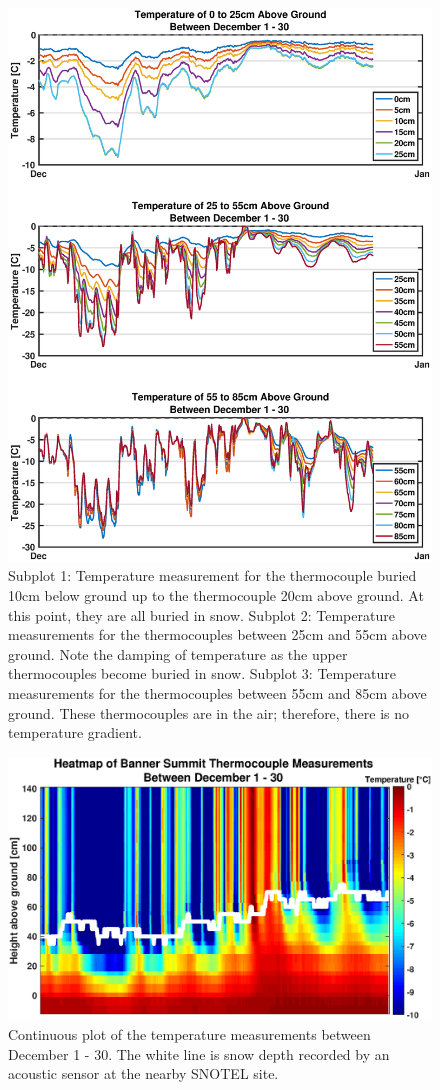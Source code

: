 \begin{figure}[H]
    \centering
    \includegraphics[width=0.9\linewidth]{figures/TCArray/Dec1_30_TC.eps}
    \caption{Subplot 1: Temperature measurement for the thermocouple buried 10cm below ground up to the thermocouple 20cm above ground. At this point, they are all buried in snow. Subplot 2: Temperature measurements for the thermocouples between 25cm and 55cm above ground. Note the damping of temperature as the upper thermocouples become buried in snow. Subplot 3: Temperature measurements for the thermocouples between 55cm and 85cm above ground. These thermocouples are in the air; therefore, there is no temperature gradient.}
    \label{fig:Dec1_30_TC}
 \end{figure}

\begin{figure}[H]
    \centering
    \includegraphics[width=0.9\linewidth]{figures/TCArray/Dec1_30Heatmap.eps}
    \caption{Continuous plot of the temperature measurements between December 1 - 30. The white line is  snow depth recorded by an acoustic sensor at the nearby SNOTEL site. }
    \label{fig:Dec_Jan_ImageSC}
 \end{figure}

